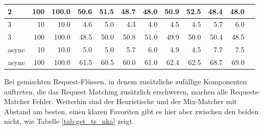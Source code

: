 \documentclass[12pt,a4paper]{report}
\begin{document}
\begin{table}[H]
\begin{tabular}{|l|r|r|r|r|r|r|r|r|r|r|r|}
		2                        & 100                            & 100.0                          & 50.6                          & 51.5                          & 48.7                            & 48.0 & 50.9 & 52.5 & 48.4 & 48.0 \\ \hline
		3                        & 10                             & 10.0                           & 4.6                           & 5.0                           & 4.3                             & 4.0  & 4.5  & 4.5  & 5.7  & 6.0  \\ \hline
		3                        & 100                            & 100.0                          & 48.5                          & 50.0                          & 50.8                            & 51.0 & 49.9 & 50.0 & 50.4 & 48.5 \\ \hline
		async                    & 10                             & 10.0                           & 5.0                           & 5.0                           & 5.7                             & 6.0  & 4.9  & 4.5  & 7.7  & 7.5  \\ \hline
		async                    & 100                            & 100.0                          & 61.5                          & 60.5                          & 60.0                            & 61.0 & 62.4 & 62.5 & 68.7 & 69.0 \\ \hline
	\end{tabular}
\end{table}

Bei gemischten Request-Flüssen, in denem zusätzliche zufällige Komponenten auftreten, die das Request Matching zusätzlich erschweren,
machen alle Requests-Matcher Fehler. Weiterhin sind der Heuristische und der Mix-Matcher mit Abstand am besten, einen
klaren Favoriten gibt es hier aber zwischen den beiden nicht, wie Tabelle \ref{tab:get_ts_nka} zeigt.
\end{document}
